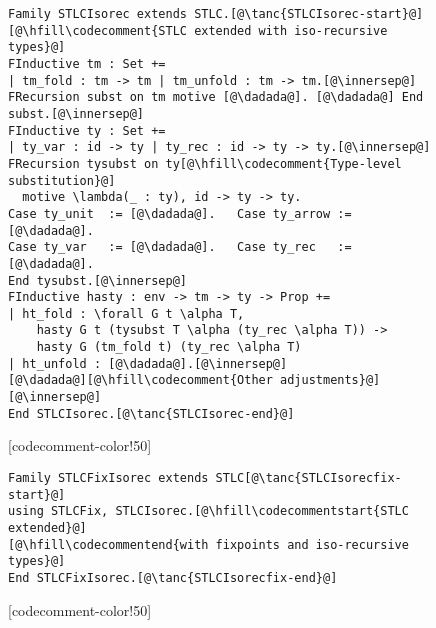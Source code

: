 \begin{figure}

\newcommand{\innersep}{\vspace{5pt}}

\begin{minipage}{\textwidth}
\begin{multicols}{2}


\begin{lstlisting}
Family STLCIsorec extends STLC.[@\tanc{STLCIsorec-start}@]
[@\hfill\codecomment{STLC extended with iso-recursive types}@]
FInductive tm : Set +=
| tm_fold : tm -> tm | tm_unfold : tm -> tm.[@\innersep@]
FRecursion subst on tm motive [@\dadada@]. [@\dadada@] End subst.[@\innersep@]
FInductive ty : Set +=
| ty_var : id -> ty | ty_rec : id -> ty -> ty.[@\innersep@]
FRecursion tysubst on ty[@\hfill\codecomment{Type-level substitution}@]
  motive \lambda(_ : ty), id -> ty -> ty.
Case ty_unit  := [@\dadada@].   Case ty_arrow := [@\dadada@].
Case ty_var   := [@\dadada@].   Case ty_rec   := [@\dadada@].
End tysubst.[@\innersep@]
FInductive hasty : env -> tm -> ty -> Prop +=
| ht_fold : \forall G t \alpha T,
    hasty G t (tysubst T \alpha (ty_rec \alpha T)) ->
    hasty G (tm_fold t) (ty_rec \alpha T)
| ht_unfold : [@\dadada@].[@\innersep@]
[@\dadada@][@\hfill\codecomment{Other adjustments}@][@\innersep@]
End STLCIsorec.[@\tanc{STLCIsorec-end}@]
\end{lstlisting}

[codecomment-color!50]

\vspace{-12pt}


\begin{lstlisting}
Family STLCFixIsorec extends STLC[@\tanc{STLCIsorecfix-start}@]
using STLCFix, STLCIsorec.[@\hfill\codecommentstart{STLC extended}@]
[@\hfill\codecommentend{with fixpoints and iso-recursive types}@]
End STLCFixIsorec.[@\tanc{STLCIsorecfix-end}@]
\end{lstlisting}

[codecomment-color!50]

\columnbreak



\end{multicols}
\end{minipage}
\end{figure}
